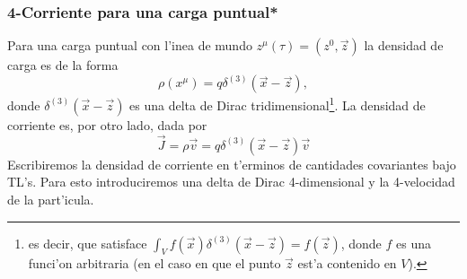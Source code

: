 
\subsubsection{4-Corriente para una carga puntual*}
Para una carga puntual con l'inea de mundo $z^\mu(\tau)=(z^0,\vec{z})$ la
densidad de carga es de la forma
\begin{equation}
\rho(x^\mu)=q\delta^{(3)}\left(\vec{x}-\vec{z}\right) ,
\end{equation}
donde $\delta^{(3)}\left(\vec{x}-\vec{z}\right)$ es una delta de Dirac
tridimensional\footnote{es decir, que satisface $\int_V
f(\vec{x})\delta^{(3)}\left(\vec{x}-\vec{z}\right)=f(\vec{z})$, donde $f$ es una
funci'on arbitraria (en el caso en que el punto $\vec{z}$ est'a contenido en
$V$).}. La densidad de corriente es, por otro lado, dada por
\begin{equation}
\vec{J}=\rho\vec{v}=q\delta^{(3)}\left(\vec{x}-\vec{z}\right)\vec{v}
\end{equation}
Escribiremos la densidad de corriente en t'erminos de cantidades covariantes
bajo TL's. Para esto introduciremos una delta de Dirac 4-dimensional y la
4-velocidad de la part'icula.

